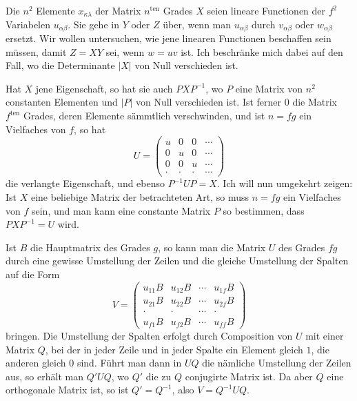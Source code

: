 \documentclass[11pt]{article}
\newcommand{\ten}{\mathrm{ten}}
\begin{document}
Die $n^2$ Elemente $x_{\kappa\lambda}$ der Matrix $n^{\ten}$ Grades $X$ seien lineare Functionen der $f^2$ Variabelen $u_{\alpha\beta}$. Sie gehe in $Y$ oder $Z$ über, wenn man $u_{\alpha\beta}$ durch $v_{\alpha\beta}$ oder $w_{\alpha\beta}$ ersetzt. Wir wollen untersuchen, wie jene linearen Functionen beschaffen sein müssen, damit $Z=XY$ sei, wenn $w=uv$ ist. Ich beschränke mich dabei auf den Fall, wo die Determinante $|X|$ von Null verschieden ist.

Hat $X$ jene Eigenschaft, so hat sie auch $PXP^{-1}$, wo $P$ eine Matrix von $n^2$ constanten Elementen und $|P|$ von Null verschieden ist. Ist ferner $0$ die Matrix $f^{\ten}$ Grades, deren Elemente sämmtlich verschwinden, und ist $n=fg$ ein Vielfaches von $f$, so hat
\[
U=\begin{pmatrix}
u&0&0&\cdots\\
0&u&0&\cdots\\
0&0&u&\cdots\\
\cdot&\cdot&\cdot&\cdots
\end{pmatrix}
\]
die verlangte Eigenschaft, und ebenso $P^{-1}UP=X$. Ich will nun umgekehrt zeigen: Ist $X$ eine beliebige Matrix der betrachteten Art, so muss $n=fg$ ein Vielfaches von $f$ sein, und man kann eine constante Matrix $P$ so bestimmen, dass $PXP^{-1}=U$ wird.

Ist $B$ die Hauptmatrix des Grades $g$, so kann man die Matrix $U$ des Grades $fg$ durch eine gewisse Umstellung der Zeilen und die gleiche Umstellung der Spalten auf die Form
\[
V=\begin{pmatrix}
u_{11}B&u_{12}B&\cdots&u_{1f}B\\
u_{21}B&u_{22}B&\cdots&u_{2f}B\\
\cdot&\cdot&\cdots&\cdot\\
u_{f1}B&u_{f2}B&\cdots&u_{ff}B
\end{pmatrix}
\]
bringen. Die Umstellung der Spalten erfolgt durch Composition von $U$ mit einer Matrix $Q$, bei der in jeder Zeile und in jeder Spalte ein Element gleich $1$, die anderen gleich $0$ sind. Führt man dann in $UQ$ die nämliche Umstellung der Zeilen aus, so erhält man $Q'UQ$, wo $Q'$ die zu $Q$ conjugirte Matrix ist. Da aber $Q$ eine orthogonale Matrix ist, so ist $Q'=Q^{-1}$, also $V=Q^{-1}UQ$.
\end{document}
